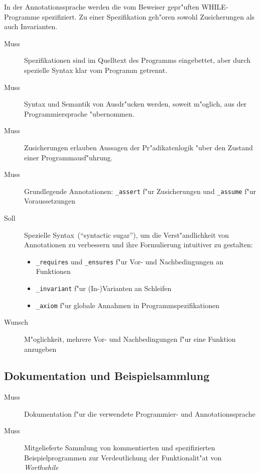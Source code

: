 In der \see Annotationssprache werden die vom Beweiser gepr"uften WHILE-Programme spezifiziert. Zu einer Spezifikation geh"oren sowohl Zusicherungen als auch Invarianten.%

\begin{description}%
    \item [Muss] Spezifikationen sind im Quelltext des Programms eingebettet, aber durch spezielle Syntax klar vom Programm getrennt.%
    \item [Muss] Syntax und Semantik von Ausdr"ucken werden, soweit m"oglich, aus der Programmiersprache "ubernommen.%
    \item [Muss] Zusicherungen erlauben Aussagen der \see Pr"adikatenlogik "uber den Zustand einer Programmausf"uhrung.%
    \item [Muss] Grundlegende Annotationen: \texttt{\_assert} f"ur Zusicherungen und \texttt{\_assume} f"ur Voraussetzungen%
    \item [Soll] Spezielle Syntax~("`syntactic sugar"'), um die Verst"andlichkeit von Annotationen zu verbessern und ihre Formulierung intuitiver zu gestalten:%
        \begin{itemize}%
            \item \texttt{\_requires} und \texttt{\_ensures} f"ur \see Vor- und Nachbedingungen an Funktionen%
            \item \texttt{\_invariant} f"ur \see (In-)Varianten an Schleifen%
            \item \texttt{\_axiom} f"ur \see globale Annahmen in Programmspezifikationen%
        \end{itemize}%
    \item [Wunsch] M"oglichkeit, mehrere Vor- und Nachbedingungen f"ur eine Funktion anzugeben%
\end{description}%

\subsection{Dokumentation und Beispielsammlung}%

\begin{description}%
    \item [Muss] Dokumentation f"ur die verwendete Programmier- und Annotationssprache%
    \item [Muss] Mitgelieferte Sammlung von kommentierten und spezifizierten Beispielprogrammen zur Verdeutlichung der Funktionalit"at von \textit{Worthwhile}%
\end{description}%
